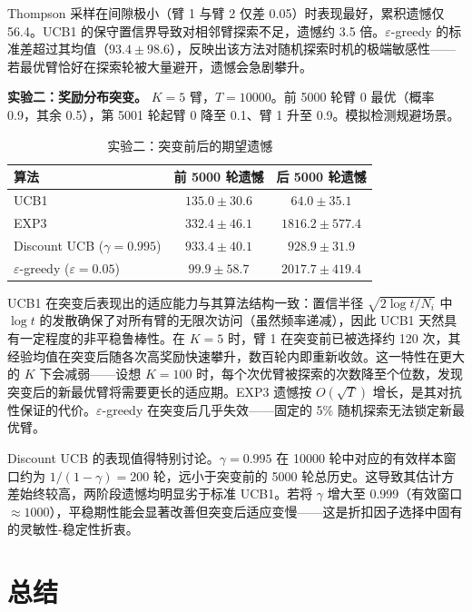 \documentclass[UTF8,a4paper,11pt,zihao=5]{ctexart}
\begin{document}
Thompson 采样在间隙极小（臂 1 与臂 2 仅差 0.05）时表现最好，累积遗憾仅 56.4。UCB1 的保守置信界导致对相邻臂探索不足，遗憾约 3.5 倍。$\varepsilon$-greedy 的标准差超过其均值（$93.4 \pm 98.6$），反映出该方法对随机探索时机的极端敏感性——若最优臂恰好在探索轮被大量避开，遗憾会急剧攀升。

\textbf{实验二：奖励分布突变。} $K=5$ 臂，$T=10000$。前 5000 轮臂 0 最优（概率 0.9，其余 0.5），第 5001 轮起臂 0 降至 0.1、臂 1 升至 0.9。模拟检测规避场景。

\begin{table}[htbp]
\centering
\caption{实验二：突变前后的期望遗憾}
\label{tab:exp2}
\begin{tabular}{@{}lcc@{}}
\toprule
\textbf{算法} & \textbf{前 5000 轮遗憾} & \textbf{后 5000 轮遗憾} \\
\midrule
UCB1                              & $135.0 \pm 30.6$  & $64.0 \pm 35.1$ \\
EXP3                              & $332.4 \pm 46.1$  & $1816.2 \pm 577.4$ \\
Discount UCB ($\gamma{=}0.995$)   & $933.4 \pm 40.1$  & $928.9 \pm 31.9$ \\
$\varepsilon$-greedy ($\varepsilon{=}0.05$)  & $99.9 \pm 58.7$   & $2017.7 \pm 419.4$ \\
\bottomrule
\end{tabular}
\end{table}

UCB1 在突变后表现出的适应能力与其算法结构一致：置信半径 $\sqrt{2\log t/N_i}$ 中 $\log t$ 的发散确保了对所有臂的无限次访问（虽然频率递减），因此 UCB1 天然具有一定程度的非平稳鲁棒性。在 $K=5$ 时，臂 1 在突变前已被选择约 120 次，其经验均值在突变后随各次高奖励快速攀升，数百轮内即重新收敛。这一特性在更大的 $K$ 下会减弱——设想 $K=100$ 时，每个次优臂被探索的次数降至个位数，发现突变后的新最优臂将需要更长的适应期。EXP3 遗憾按 $O(\sqrt{T})$ 增长，是其对抗性保证的代价。$\varepsilon$-greedy 在突变后几乎失效——固定的 5\% 随机探索无法锁定新最优臂。

Discount UCB 的表现值得特别讨论。$\gamma=0.995$ 在 10000 轮中对应的有效样本窗口约为 $1/(1-\gamma)=200$ 轮，远小于突变前的 5000 轮总历史。这导致其估计方差始终较高，两阶段遗憾均明显劣于标准 UCB1。若将 $\gamma$ 增大至 0.999（有效窗口 $\approx 1000$），平稳期性能会显著改善但突变后适应变慢——这是折扣因子选择中固有的灵敏性-稳定性折衷。
\newpage

\section{总结}
\end{document}
